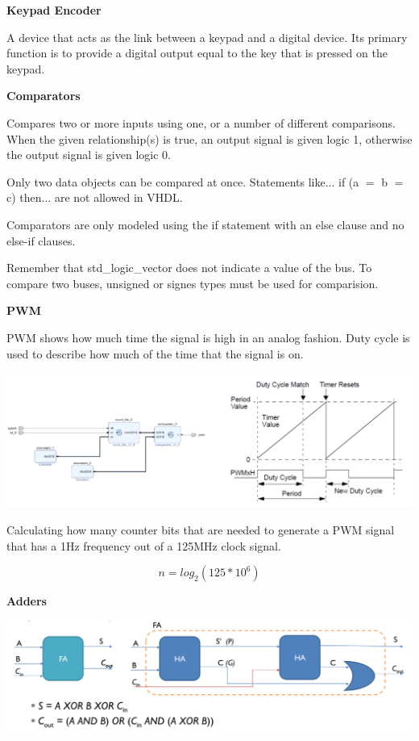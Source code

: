 \textbf{Keypad Encoder}

A device that acts as the link between a keypad and a digital device.
Its primary function is to provide a digital output equal to the
key that is pressed on the keypad.


\textbf{Comparators}

Compares two or more inputs using one, or a number of different comparisons.
When the given relationship(s) is true, an output signal is given
logic 1, otherwise the output signal is given logic 0.

Only two data objects can be compared at once.
Statements like... if (a $=$ b $=$ c) then... are not allowed in VHDL.

Comparators are only modeled using the if statement with an else
clause and no else-if clauses.

Remember that std\_logic\_vector does not indicate a value of the bus.
To compare two buses, unsigned or signes types must be used
for comparision.

\textbf{PWM}

PWM shows how much time the signal is high in an analog fashion.
Duty cycle is used to describe how much of the time
that the signal is on.

\begin{center}
	\includegraphics[width=\textwidth]{images/pwm.png}
\end{center}


Calculating how many counter bits that are needed to generate
a PWM signal that has a 1Hz frequency out of a 125MHz clock signal.

$$ n = log_2(125*10^6)$$

\textbf{Adders}

\begin{center}
	\includegraphics[width=\textwidth]{images/FA.png}
\end{center}


